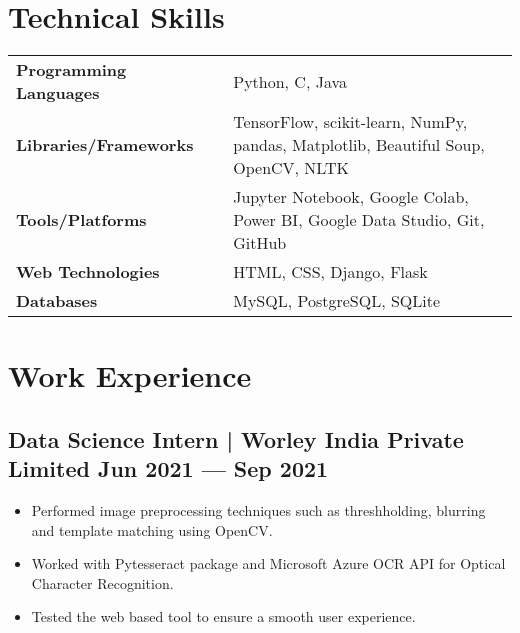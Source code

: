 \documentclass[10pt]{article}
\newenvironment{zitemize}{
\begin{itemize}\itemsep2pt \parskip0pt \parsep1pt}
{\end{itemize}\vspace{-0.7cm}}
\newcommand{\hskills}[1]{
\textbf{\bfseries #1} }
\begin{document}
\section{Technical Skills}
\begin{tabular}{p{11em} p{1em} p{43em}}
\hskills{Programming Languages }&  &  Python, C, Java \\
\hskills{Libraries/Frameworks} &  & TensorFlow, scikit-learn, NumPy, pandas, Matplotlib, Beautiful Soup, OpenCV, NLTK \\
\hskills{Tools/Platforms} &  & Jupyter Notebook, Google Colab, Power BI, Google Data Studio, Git, GitHub \\
\hskills{Web Technologies} &  & HTML, CSS, Django, Flask \\
\hskills{Databases} &  & MySQL, PostgreSQL, SQLite \\

\end{tabular}
\vspace{-0.4cm}

\section{Work Experience}
    \vspace{2pt}
\subsection*{Data Science Intern | \normalfont{} \normalsize Worley India Private Limited \hfill \textbf{Jun 2021 --- Sep 2021}} 

    \begin{zitemize}
        \item Performed image preprocessing techniques such as threshholding, blurring and template matching using OpenCV.
        \item Worked with Pytesseract package and Microsoft Azure OCR API for Optical Character Recognition.
        \item Tested the web based tool to ensure a smooth user experience.
    \end{zitemize}
\vspace{0.0cm}
\end{document}
